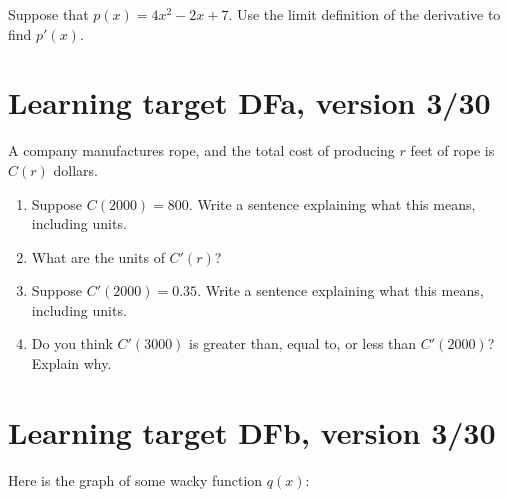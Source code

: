 Suppose that $p(x) = 4x^2 - 2x + 7$.
Use the limit definition of the derivative to find $p'(x)$. 

\pagebreak

\section{Learning target DFa, version 3/30}

A company manufactures rope, and the total cost of producing $r$ feet of rope is $C(r)$ dollars.
\begin{enumerate}[leftmargin=0pt]
    \item Suppose $C(2000) = 800$. Write a sentence explaining what this means, including units.
    \vfill
    \item What are the units of $C'(r)$?
    \vfill
    \item Suppose $C'(2000) = 0.35$. Write a sentence explaining what this means, including units.
    \vfill
    \item Do you think $C'(3000)$ is greater than, equal to, or less than $C'(2000)$? Explain why.
    \vfill
\end{enumerate}

\pagebreak

\section{Learning target DFb, version 3/30}

Here is the graph of some wacky function $q(x)$:

